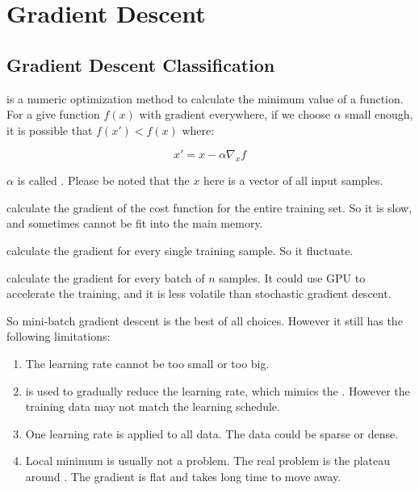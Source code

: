 \section{Gradient Descent}

\subsection{Gradient Descent Classification}

 is a numeric optimization method to calculate the minimum value of a function. For a give function $f(x)$ with gradient everywhere, if we choose $\alpha$ small enough, it is possible that $f(x') < f(x)$ where:

\begin{equation}\label{gradientdescentdefinition}
    x' = x - \alpha \nabla_x f
\end{equation}


$\alpha$ is called . Please be noted that the $x$ here is a vector of all input samples.


 calculate the gradient of the cost function for the entire training set. So it is slow, and sometimes cannot be fit into the main memory.

 calculate the gradient for every single training sample. So it fluctuate. 


 calculate the gradient for every batch of $n$ samples. It could use GPU to accelerate the training, and it is less volatile than stochastic gradient descent.

So mini-batch gradient descent is the best of all choices. However it still has the following limitations:
\begin{enumerate}
    \item The learning rate cannot be too small or too big.
    \item {} is used to gradually reduce the learning rate, which mimics the . However the training data may not match the learning schedule. 
    \item One learning rate is applied to all data. The data could be sparse or dense.
    \item Local minimum is usually not a problem. The real problem is the plateau around . The gradient is flat and takes long time to move away.
\end{enumerate}

